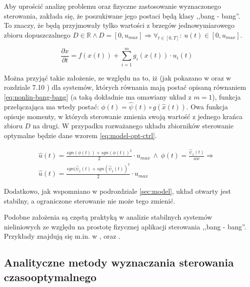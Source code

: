 Aby uprościć analizę problemu oraz fizyczne zastosowanie wyznaczonego sterowania, zakłada się, że poszukiwane jego postaci będą klasy ,,bang - bang''. To znaczy, że będą przyjmowały tylko wartości z brzegów jednowymiarowego zbioru dopuszczalnego $D \in \mathbb{R} \land D = [0, u_{max}] \Rightarrow \forall_{t \in [0, T]}:~ u(t) \in [0, u_{max}]$.

\begin{equation}\label{eq:nonlin-bang-bang}
    \frac{\partial x}{\partial t} = f(x(t)) + \sum_{i=1}^{m} g_{i}(x(t)) \cdot u_{i}(t)
\end{equation}

Można przyjąć takie założenie, ze względu na to, iż (jak pokazano w \cite{YiMa2008} oraz w rozdziale 7.10 \cite{AthansOptCtrl}) dla systemów, których równania mają postać opisaną równaniem \ref{eq:nonlin-bang-bang} (a taką dokładnie ma omawiany układ z $m = 1$), funkcja przełączająca ma wtedy postać: $\phi(t) = \hat{\psi}(t) \circ g(\hat{x}(t))$. Owa funkcja opisuje momenty, w których sterowanie zmienia swoją wartość z jednego krańca zbioru $D$ na drugi. W przypadku rozważanego układu zbiorników sterowanie optymalne będzie dane wzorem \ref{eq:model-opt-ctrl}.

\begin{equation}\label{eq:model-opt-ctrl}
\begin{array}{lr}
    \hat{u}(t) = \frac{sgn(\phi(t)) + sgn(\phi(t))^{2}}{2} \cdot u_{max} ~ \land ~ \phi(t) = \frac{\hat{\psi}_{1}(t)}{aw} \Rightarrow \\
    \hat{u}(t) = \frac{sgn(\hat{\psi}_{1}(t) + sgn(\hat{\psi}_{1}(t))^{2}}{2} \cdot u_{max}
\end{array}
\end{equation}

Dodatkowo, jak wspomniano w podrozdziale \ref{sec:model}, układ otwarty jest stabilny, a ograniczone sterowanie nie może tego zmienić.

Podobne założenia są częstą praktyką w analizie stabilnych systemów nieliniowych ze względu na prostotę fizycznej aplikacji sterowania ,,bang - bang''. Przykłady znajdują się m.in. w \cite{VakKek82}, \cite{BalSom83} oraz \cite{Itik2016}.

\subsection{Analityczne metody wyznaczania sterowania czasooptymalnego}
\label{sub:toc-ctrl}

